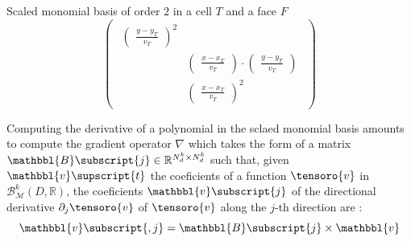 \begin{exemplebox}{Scaled monomial basis of order $2$ in a cell $T$ and a face $F$}
\begin{equation}
\begin{pmatrix}
\begin{aligned}
\begin{pmatrix}
                            \displaystyle
                            \frac{y - y_T}{v_T}
                        \end{pmatrix}
                        ^2
                        \\
                        & \begin{pmatrix}
                            \displaystyle
                            \frac{x - x_T}{v_T}
                        \end{pmatrix}
                        \cdot
                        \begin{pmatrix}
                            \displaystyle
                            \frac{y - y_T}{v_T}
                        \end{pmatrix}
                        \\
                        & \begin{pmatrix}
                            \displaystyle
                            \frac{x - x_T}{v_T}
                        \end{pmatrix}
                        ^2
                    \end{aligned}
                \end{pmatrix}
            \end{equation}
        \end{exemplebox}

        Computing the derivative of a polynomial in the sclaed monomial basis amounts to compute the gradient operator $\nabla$ which takes the form of a matrix $\mathbbl{B}\subscript{j} \in \mathbb{R}^{N_d^k \times N_d^k}$ such that, given ${\mathbbl{v}}\supscript{t}$ the coeficients of a function $\tensoro{v}$ in $\mathcal{B}_{\mathcal{M}}^k(D, \mathbb{R})$, the coeficients ${\mathbbl{v}}\subscript{j}$ of the directional derivative $\partial_j \tensoro{v}$ of $\tensoro{v}$ along the $j$-th direction are :
        \begin{equation}
            {\mathbbl{v}}\subscript{,j} = \mathbbl{B}\subscript{j} \times {\mathbbl{v}}
        \end{equation}
        

